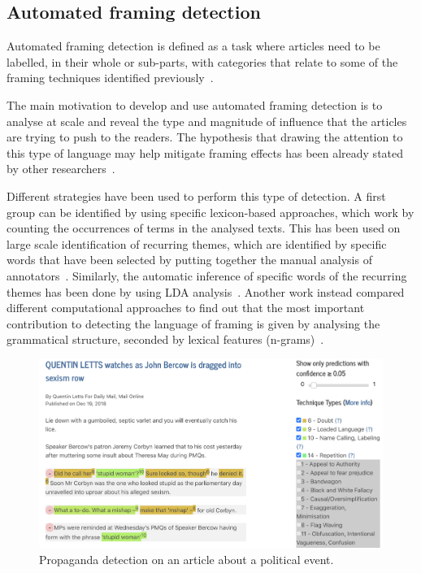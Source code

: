 \subsection{Automated framing detection}
\label{ssec:lit_framing_auto}

Automated framing detection is defined as a task where articles need to be labelled, in their whole or sub-parts, with categories that relate to some of the framing techniques identified previously~\cite{morstatter2018identifying,liu2019detecting}.

The main motivation to develop and use automated framing detection is to analyse at scale and reveal the type and magnitude of influence that the articles are trying to push to the readers. The hypothesis that drawing the attention to this type of language may help mitigate framing effects has been already stated by other researchers~\cite{baumer2015testing}.


Different strategies have been used to perform this type of detection.
A first group can be identified by using specific lexicon-based approaches, which work by counting the occurrences of terms in the analysed texts.
This has been used on large scale identification of recurring themes, which are identified by specific words that have been selected by putting together the manual analysis of annotators~\cite{field2018framing}.
Similarly, the automatic inference of specific words of the recurring themes has been done by using LDA analysis~\cite{tsur2015frame}.
Another work instead compared different computational approaches to find out that the most important contribution to detecting the language of framing is given by analysing the grammatical structure, seconded by lexical features (n-grams)~\cite{baumer2015testing}.


\begin{figure}[!htb]
    \centering
    \includegraphics[width=\linewidth]{figures/brexit_propaganda.png}
    \caption{Propaganda detection on an article about a political event.}
    \label{fig:brexit_propaganda}
\end{figure}

